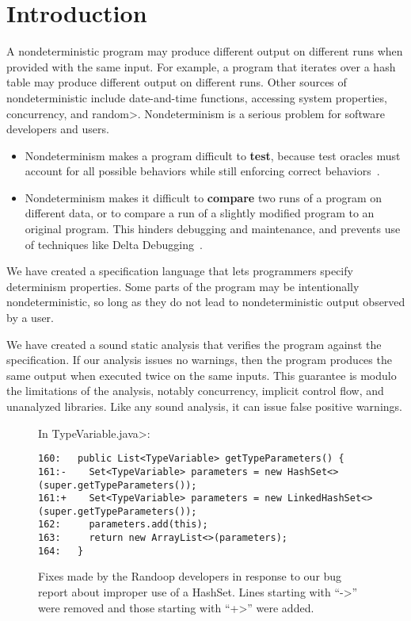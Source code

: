 \section{Introduction\label{sec:introduction}}

A nondeterministic program may produce different output on different runs
when provided with the same input.
For example, a program that iterates over a hash table
may produce different output on different runs.
Other sources of nondeterministic include
date-and-time functions,
accessing system properties,
concurrency,
and \<random>.
%
Nondeterminism is a serious problem for software developers and users.
\begin{itemize}
\item
  Nondeterminism makes a program difficult to \textbf{test}, because test
  oracles must account for all possible behaviors while still enforcing
  correct behaviors~\cite{LuoHEM2014,ShiGLM2016,BellLHEYM2018,Sudarshan}.
\item
  Nondeterminism makes it difficult to \textbf{compare} two runs of a
  program on different data, or to compare a run of a slightly modified
  program to an original program.  This hinders debugging and maintenance,
  and prevents use of techniques like Delta Debugging~\cite{Zeller1999,YuLCZ2012}.
\end{itemize}


We have created a specification language that lets programmers specify
determinism properties.
Some parts of the program may be intentionally nondeterministic, so long
as they do not lead to nondeterministic output observed by a user.  

We have created a sound static analysis that verifies the program against the specification.
If our analysis issues no warnings, then the program produces the same
output when executed twice on the same inputs.  This guarantee is modulo
the limitations of the
analysis, notably concurrency, implicit control flow, and unanalyzed libraries.
Like any
sound analysis, it can issue false positive warnings.

\begin{figure*}

\noindent
In \<TypeVariable.java>:

\begin{Verbatim}
160:   public List<TypeVariable> getTypeParameters() {
161:-    Set<TypeVariable> parameters = new HashSet<>(super.getTypeParameters());
161:+    Set<TypeVariable> parameters = new LinkedHashSet<>(super.getTypeParameters());
162:     parameters.add(this);
163:     return new ArrayList<>(parameters);
164:   }
\end{Verbatim}

\caption{Fixes made by the Randoop developers in response to our bug report
  about improper use of a HashSet.  Lines starting with ``\<->'' were
 removed and those starting with ``\<+>'' were added.}
\label{fig:randoop-bug-hashset}
\end{figure*}



